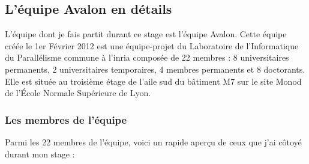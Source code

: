 \subsection{L'équipe Avalon en détails}
L'équipe dont je fais partit durant ce stage est l'équipe Avalon. Cette équipe créée le 1er Février 2012 \cite{avalonAR2012} est une équipe-projet du Laboratoire de l'Informatique du Parallélisme commune à l'\gls{inria} composée de 22 membres : 8 universitaires permanents, 2 universitaires temporaires, 4 membres permanents et 8 doctorants. Elle est située au troisième étage de l'aile sud du bâtiment M7 sur le site Monod de l'École Normale Supérieure de Lyon.

\subsubsection{Les membres de l'équipe}
Parmi les 22 membres de l'équipe, voici un rapide aperçu de ceux que j'ai côtoyé durant mon stage :\\

